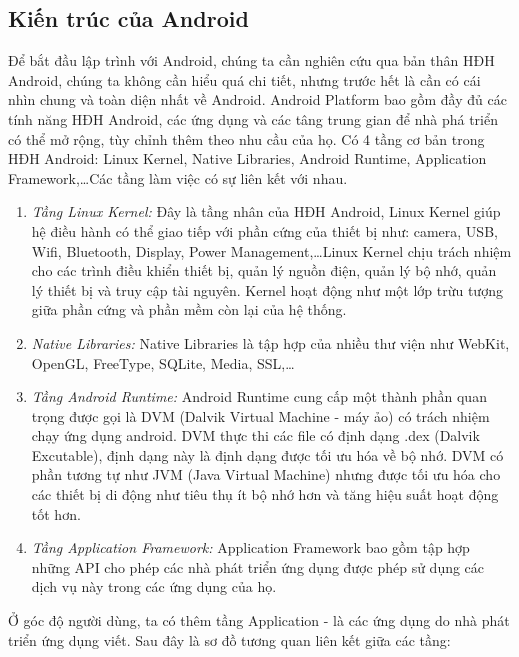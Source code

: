 \subsection{Kiến trúc của Android}
Để bắt đầu lập trình với Android, chúng ta cần nghiên cứu qua bản thân HĐH Android, chúng ta không cần hiểu quá chi tiết, nhưng trước hết là cần có cái nhìn chung và toàn diện nhất về Android.
\newline
Android Platform bao gồm đầy đủ các tính năng HĐH Android, các ứng dụng và các tâng trung gian để nhà phá triển có thể mở rộng, tùy chỉnh thêm theo nhu cầu của họ. Có 4 tầng cơ bản trong HĐH Android: Linux Kernel, Native Libraries, Android Runtime, Application Framework,\dots Các tầng làm việc có sự liên kết với nhau.
\begin{enumerate}
    \item{\textit{Tầng Linux Kernel:}}
    Đây là tầng nhân của HĐH Android, Linux Kernel giúp hệ điều hành có thể giao tiếp với phần cứng của thiết bị như: camera,  USB, Wifi, Bluetooth, Display, Power Management,\dots  Linux Kernel chịu trách nhiệm cho các trình điều khiển thiết bị, quản lý nguồn điện, quản lý bộ nhớ, quản lý thiết bị và truy cập tài nguyên. Kernel hoạt động như một lớp trừu tượng giữa phần cứng và phần mềm còn lại của hệ thống.
    \item{\textit{Native Libraries:}}
    Native Libraries là tập hợp của nhiều thư viện như WebKit, OpenGL, FreeType, SQLite, Media, SSL,\dots 
    \item{\textit{Tầng Android Runtime:}}
    Android Runtime cung cấp một thành phần quan trọng được gọi là DVM (Dalvik Virtual Machine - máy ảo) có trách nhiệm chạy ứng dụng android.
    DVM thực thi các file có định dạng .dex (Dalvik Excutable), định dạng này là định dạng được tối ưu hóa về bộ nhớ.
    \newline
    DVM có phần tương tự như JVM (Java Virtual Machine) nhưng được tối ưu hóa cho các thiết bị di động như tiêu thụ ít bộ nhớ hơn và tăng hiệu suất hoạt động tốt hơn.
    \item{\textit{Tầng Application Framework:}}
    Application Framework bao gồm tập hợp những API cho phép các nhà phát triển ứng dụng được phép sử dụng các dịch vụ này trong các ứng dụng của họ.
\end{enumerate}
Ở góc độ người dùng, ta có thêm tầng Application - là các ứng dụng do nhà phát triển ứng dụng viết. Sau đây là sơ đồ tương quan liên kết giữa các tầng:


